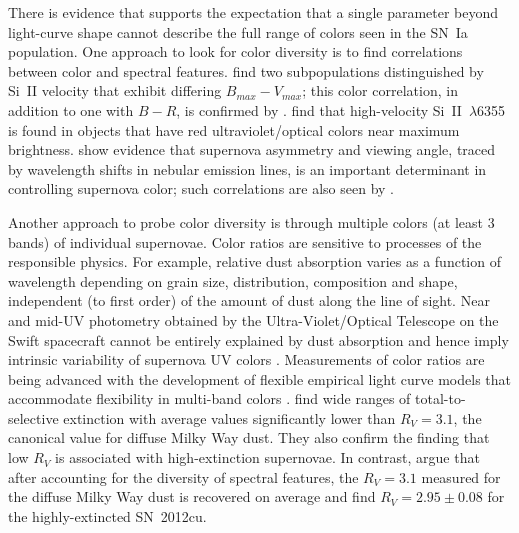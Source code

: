 \documentclass[trackchanges]{aastex61}   	%
\begin{document}
There is evidence that supports the expectation that a single parameter beyond light-curve shape  cannot describe the full range
of colors seen in the SN~Ia population.  One approach to look for color diversity is to find correlations between color and spectral features.
\citet{2009ApJ...699L.139W, 2011ApJ...729...55F} find two subpopulations distinguished
by Si~II velocity that exhibit differing $B_{\mathit{\mathit{max}}}-V_{\mathit{max}}$; this color correlation, in addition to one with $B-R$, is confirmed by
\citet{2014ApJ...797...75M}.
\citet{2015MNRAS.451.1973S}
find that high-velocity Si~II~$\lambda$6355 is found in objects that have red ultraviolet/optical colors near maximum brightness.
\citet{2011MNRAS.413.3075M} show evidence that supernova asymmetry and viewing angle,
traced by wavelength shifts in nebular emission lines, is an important determinant in controlling supernova color; such correlations are also seen by \citet{2011A&A...534L..15C}.

Another approach to probe color diversity is through multiple colors (at least 3 bands)
of individual supernovae.  Color ratios are sensitive to processes of the responsible physics.   For example,
relative dust absorption varies as a function of wavelength depending on grain size, distribution, composition and shape,
independent (to first order) of the amount of dust along the line of sight.
Near and mid-UV photometry obtained by the Ultra-Violet/Optical Telescope on the Swift spacecraft cannot be entirely explained
by dust absorption and hence imply intrinsic variability of supernova UV colors
\citep{2017ApJ...836..232B}.
Measurements of color ratios are being advanced with the development of flexible empirical light curve models that accommodate flexibility in multi-band colors
\citep[e.g.][]{2011ApJ...731..120M}.
\citet{2014ApJ...789...32B, 2015MNRAS.453.3300A} find wide
ranges of total-to-selective extinction with average values significantly lower than $R_V = 3.1$,
the canonical value for diffuse Milky Way dust.
They also confirm the \citet{2011ApJ...731..120M, 2011ApJ...729...55F} finding that low $R_V$ is associated with high-extinction supernovae.
In contrast, \citet{2011A&A...529L...4C} argue that after accounting for the diversity of spectral features,
the $R_V=3.1$ measured for the diffuse Milky Way dust is recovered on average and \citet{2017ApJ...836..157H}
find $R_V=2.95 \pm 0.08$ for the highly-extincted SN~2012cu.

\end{document}
